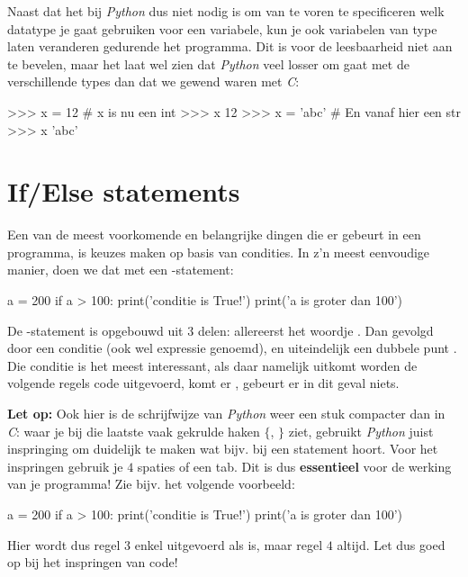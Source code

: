 
Naast dat het bij \textit{Python} dus niet nodig is om van te voren te specificeren welk datatype je gaat gebruiken voor een variabele, kun je ook variabelen van type laten veranderen gedurende het programma. Dit is voor de leesbaarheid niet aan te bevelen, maar het laat wel zien dat \textit{Python} veel losser om gaat met de verschillende types dan dat we gewend waren met \textit{C}:
\begin{python}
>>> x = 12  # x is nu een int
>>> x
12
>>> x = 'abc'  # En vanaf hier een str
>>> x
'abc'
\end{python}

\section{If/Else statements}
Een van de meest voorkomende en belangrijke dingen die er gebeurt in een programma, is keuzes maken op basis van condities. In z'n meest eenvoudige manier, doen we dat met een -statement:
\begin{python}
a = 200
if a > 100:
	print('conditie is True!')
	print('a is groter dan 100')
\end{python}
De -statement is opgebouwd uit $3$ delen: allereerst het woordje . Dan gevolgd door een conditie (ook wel expressie genoemd), en uiteindelijk een dubbele punt \pyth{:}. Die conditie is het meest interessant, als daar namelijk  uitkomt worden de volgende regels code uitgevoerd, komt er , gebeurt er in dit geval niets. 

\begin{remark}
\textbf{Let op:} Ook hier is de schrijfwijze van \textit{Python} weer een stuk compacter dan in \textit{C}: waar je bij die laatste vaak gekrulde haken $\{$, $\}$ ziet, gebruikt \textit{Python} juist inspringing om duidelijk te maken wat bijv. bij een statement hoort. Voor het inspringen gebruik je $4$ spaties of een tab. Dit is dus \textbf{essentieel} voor de werking van je programma! Zie bijv. het volgende voorbeeld:
\begin{python}
a = 200
if a > 100:
	print('conditie is True!')
print('a is groter dan 100')
\end{python}
Hier wordt dus regel $3$ enkel uitgevoerd als  is, maar regel $4$ altijd. Let dus goed op bij het inspringen van code!
\end{remark}

